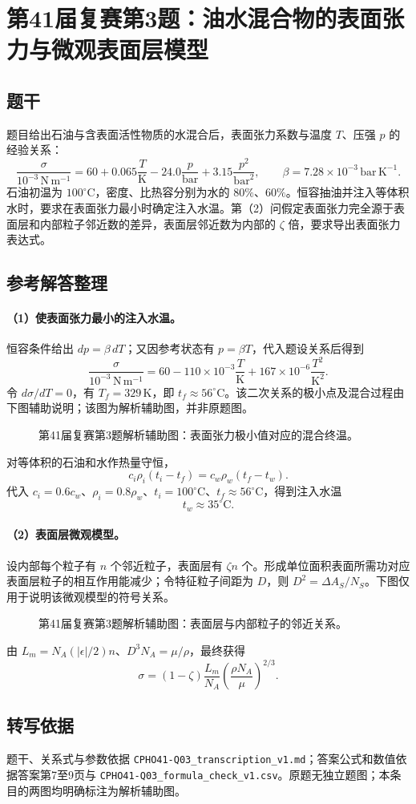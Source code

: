 \section{第41届复赛第3题：油水混合物的表面张力与微观表面层模型}
\subsection{题干}
题目给出石油与含表面活性物质的水混合后，表面张力系数与温度 $T$、压强 $p$ 的经验关系：
\[\frac{\sigma}{10^{-3}\,\mathrm{N\,m^{-1}}}=60+0.065\frac{T}{\mathrm K}-24.0\frac{p}{\mathrm{bar}}+3.15\frac{p^2}{\mathrm{bar}^2},\qquad \beta=7.28\times10^{-3}\,\mathrm{bar\,K^{-1}}.\]
石油初温为 $100^\circ\mathrm C$，密度、比热容分别为水的 $80\%$、$60\%$。恒容抽油并注入等体积水时，要求在表面张力最小时确定注入水温。第（2）问假定表面张力完全源于表面层和内部粒子邻近数的差异，表面层邻近数为内部的 $\zeta$ 倍，要求导出表面张力表达式。
\subsection{参考解答整理}
\paragraph{（1）使表面张力最小的注入水温。}
恒容条件给出 $dp=\beta\,dT$；又因参考状态有 $p=\beta T$，代入题设关系后得到
\[\frac{\sigma}{10^{-3}\,\mathrm{N\,m^{-1}}}=60-110\times10^{-3}\frac{T}{\mathrm K}+167\times10^{-6}\frac{T^2}{\mathrm K^2}.\]
令 $d\sigma/dT=0$，有 $T_f=329\,\mathrm K$，即 $t_f\approx56^\circ\mathrm C$。该二次关系的极小点及混合过程由下图辅助说明；该图为解析辅助图，并非原题图。
\begin{figure}[htbp]\centering\caption{第41届复赛第3题解析辅助图：表面张力极小值对应的混合终温。}\end{figure}
对等体积的石油和水作热量守恒，
\[c_i\rho_i(t_i-t_f)=c_w\rho_w(t_f-t_w).\]
代入 $c_i=0.6c_w$、$\rho_i=0.8\rho_w$、$t_i=100^\circ\mathrm C$、$t_f\approx56^\circ\mathrm C$，得到注入水温 \[\boxed{t_w\approx35^\circ\mathrm C}.\]

\paragraph{（2）表面层微观模型。}
设内部每个粒子有 $n$ 个邻近粒子，表面层有 $\zeta n$ 个。形成单位面积表面所需功对应表面层粒子的相互作用能减少；令特征粒子间距为 $D$，则 $D^2=\Delta A_S/N_S$。下图仅用于说明该微观模型的符号关系。
\begin{figure}[htbp]\centering\caption{第41届复赛第3题解析辅助图：表面层与内部粒子的邻近关系。}\end{figure}
由 $L_m=N_A(|\epsilon|/2)n$、$D^3N_A=\mu/\rho$，最终获得
\[\boxed{\sigma=(1-\zeta)\frac{L_m}{N_A}\left(\frac{\rho N_A}{\mu}\right)^{2/3}}.\]
\subsection{转写依据}
题干、关系式与参数依据 \texttt{CPHO41-Q03\_transcription\_v1.md}；答案公式和数值依据答案第7至9页与 \texttt{CPHO41-Q03\_formula\_check\_v1.csv}。原题无独立题图；本条目的两图均明确标注为解析辅助图。
